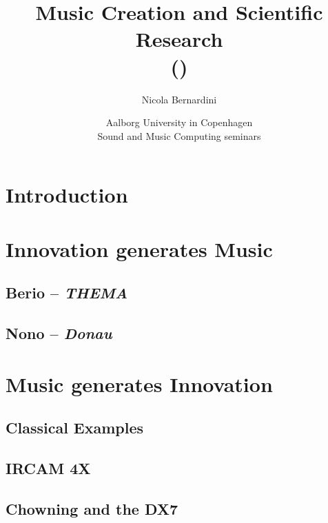 \documentclass[compress]{beamer}
\title[Music Creation and Scientific Research]
{%
    Music Creation and Scientific Research\\
	{\tiny (\rcstag)}
}
\author{%
	Nicola Bernardini\\
    \href{mailto:\cpholderemail}{\cpholderemail}
}
\institute[SMERM]%
{%
	\href{http://www.conservatoriosantacecilia.it}
		 {Conservatorio di Musica ``S.Cecilia'' -- Roma}
}
\date[Copenhagen, 20/11/2015]{Aalborg University in Copenhagen\\Sound and Music Computing seminars}
\begin{document}
  
\begin{frame}
	\titlepage
\end{frame}



\section{Introduction}



\section[Innovation $\Rightarrow$ Music]{Innovation generates Music}

\subsection{Berio -- {\it THEMA}}



\subsection{Nono -- {\it Donau}}



\section[Music $\Rightarrow$ Innovation]{Music generates Innovation}

\subsection[Classics]{Classical Examples}



\subsection[4X]{IRCAM 4X}



\subsection[DX7]{Chowning and the DX7}


\end{document}
